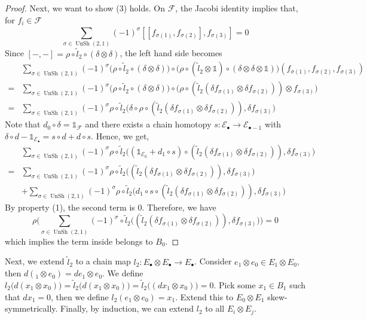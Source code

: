 \documentclass[12pt]{amsart}
\theoremstyle{definition}
\theoremstyle{remark}
\numberwithin{equation}{section}
\newcommand{\CF}{{\mathcal F}}
\newcommand{\1}{{\mathbb{1}}}
\newcommand{\E}{{\mathcal{E}}}
\newcommand{\unsh}{\operatorname{UnSh}}
\begin{document}
\begin{proof}
	Next, we want to show (3) holds. On $\CF$, the Jacobi identity implies that, for $f_i\in \CF$
	$$
	\sum_{\sigma \in \unsh(2,1)}^{}(-1)^{\sigma} [[f_{\sigma(1)}, f_{\sigma(2)}], f_{\sigma(3)}]=0
	$$
	Since $[-, -] = \rho \circ \tilde{l}_2 \circ (\delta \otimes \delta)$, the left hand side becomes
	\begin{align*}
	&\sum_{\sigma \in \unsh(2,1)}^{}(-1)^{\sigma} \big(\rho \circ \tilde{l}_2 \circ (\delta \otimes \delta)\big) \circ \big( \rho \circ (\tilde{l}_2\otimes \1 ) \circ (\delta \otimes \delta \otimes \1) \big)(f_{\sigma(1)}, f_{\sigma(2)}, f_{\sigma(3)})\\     
	=& \sum_{\sigma \in \unsh(2,1)}^{}(-1)^{\sigma} \big(\rho \circ \tilde{l}_2 \circ (\delta \otimes \delta)\big) \circ \big( \rho \circ (\tilde{l}_2(\delta f_{\sigma(1)} \otimes \delta f_{\sigma(2)}) )\otimes f_{\sigma(3)}\big)\\
	=& \sum_{\sigma \in \unsh(2,1)}^{}(-1)^{\sigma}  \rho \circ \tilde{l}_2  \Big( \delta \circ \rho \circ (\tilde{l}_2(\delta f_{\sigma(1)} \otimes \delta f_{\sigma(2)}) ), \delta f_{\sigma(3)}\Big)
	\end{align*}
	Note that $d_0\circ \delta = \1_{\CF}$ and there exists a chain homotopy $s:\E_{\bullet} \to \E_{\bullet-1}$ with $\delta \circ d - \1_{\E_{\bullet}}= s\circ d + d \circ s$. Hence, we get, 
	\begin{align*}
	&\sum_{\sigma \in \unsh(2,1)}^{}(-1)^{\sigma}  \rho \circ \tilde{l}_2  \Big( (\1_{\E_0}+  d_1\circ s ) \circ (\tilde{l}_2(\delta f_{\sigma(1)} \otimes \delta f_{\sigma(2)}) ), \delta f_{\sigma(3)}\Big)\\
	=&\sum_{\sigma \in \unsh(2,1)}^{}(-1)^{\sigma} \rho \circ \tilde{l}_2  \Big(  (\tilde{l}_2(\delta f_{\sigma(1)} \otimes \delta f_{\sigma(2)}) ), \delta f_{\sigma(3)}\Big)\\
	&+ \sum_{\sigma \in \unsh(2,1)}^{}(-1)^{\sigma}  \rho \circ \tilde{l}_2  \Big( d_1\circ s  \circ (\tilde{l}_2(\delta f_{\sigma(1)} \otimes \delta f_{\sigma(2)}) ), \delta f_{\sigma(3)}\Big)
	\end{align*}
	By property (1), the second term is 0. Therefore, we have
	$$\rho	\Big(\sum_{\sigma \in \unsh(2,1)}^{}(-1)^{\sigma}  \circ \tilde{l}_2  \Big(  (\tilde{l}_2(\delta f_{\sigma(1)} \otimes \delta f_{\sigma(2)}) ), \delta f_{\sigma(3)}\Big)\Big)=0
	$$
	    which implies the term inside belongs to $B_0$.
	\end{proof}
    Next, we extend $\tilde{l}_2$ to a chain map $l_2: E_{\bullet}\otimes E_{\bullet} \to E_{\bullet}$. Consider $e_1\otimes e_0 \in E_1\otimes E_0$, then $d(_1\otimes e_0) = de_1 \otimes e_0$. We define $l_2\big(d(x_1\otimes x_0)\big)= \tilde{l}_2\big(d(x_1\otimes x_0)\big) =\tilde{l}_2\big((dx_1\otimes x_0)\big)=0$. Pick some $x_1 \in B_1$ such that $dx_1=0$, then we define $l_2(e_1\otimes e_0) = x_1$. Extend this to $E_0\otimes E_1$ skew-symmetrically. Finally, by induction, we can extend $l_2$ to all $E_i\otimes E_j$.
    
\end{document}
